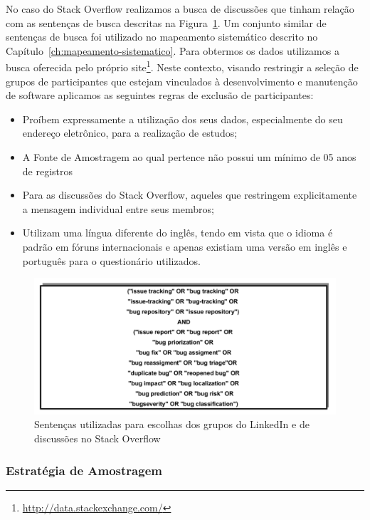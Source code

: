 No caso do Stack Overflow realizamos a busca de discussões que tinham relação
com as sentenças de busca descritas na Figura~\ref{fig:setencas-grupos}. Um
conjunto similar de sentenças de busca foi utilizado no mapeamento sistemático
descrito no Capítulo~\ref{ch:mapeamento-sistematico}. Para obtermos os dados
utilizamos a busca oferecida pelo próprio
site\footnote{\url{http://data.stackexchange.com/}}. Neste contexto, visando
restringir a seleção de grupos de participantes que estejam vinculados à
desenvolvimento e manutenção de software aplicamos as seguintes regras de
exclusão de participantes:

\begin{itemize}
	\item Proíbem expressamente a utilização dos seus dados, especialmente do
		seu endereço eletrônico, para a realização de estudos;
	\item A Fonte de Amostragem ao qual pertence não possui um mínimo de 05 anos
		de registros
	\item Para as discussões do Stack Overflow, aqueles que restringem
		explicitamente a mensagem individual entre seus membros;
    \item Utilizam uma língua diferente do inglês, tendo em vista que o idioma
		 é padrão em fóruns internacionais e apenas existiam uma versão em
		inglês e português para o questionário utilizados.
\end{itemize}

\begin{figure}[htpb]
	\centering
	\includegraphics[width=0.8\linewidth]{./chapter-pesquisa-com-profissionais/img/setencas-grupos.pdf}
	\caption{Sentenças utilizadas para escolhas dos grupos do LinkedIn e de
		discussões no Stack Overflow}
\label{fig:setencas-grupos}
\end{figure}

\subsubsection{Estratégia de Amostragem}
\label{subsubsec:pesquisa_profissionais_estrategia_amostragem}

